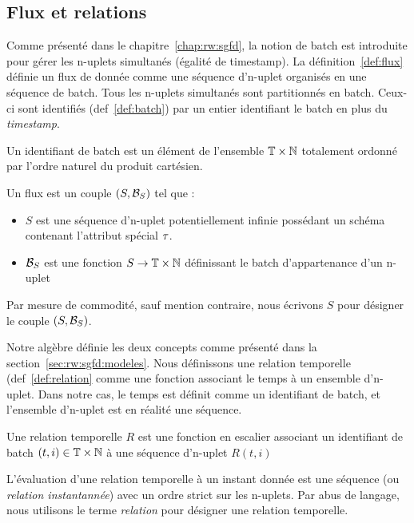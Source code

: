 \subsection{Flux et relations}
Comme présenté dans le chapitre~\ref{chap:rw:sgfd}, la notion de batch est introduite pour gérer les n-uplets simultanés (égalité de timestamp). La définition~\ref{def:flux}  définie un flux de donnée comme une séquence d'n-uplet organisés en une séquence de batch. Tous les n-uplets simultanés sont partitionnés en batch. Ceux-ci sont identifiés (def~\ref{def:batch}) par un entier identifiant le batch en plus du \textit{timestamp}.
\begin{defi}\label{def:batch}
    Un identifiant de batch est un élément de l'ensemble $\mathbb{T}\times\mathbb{N}$ totalement ordonné par l'ordre naturel du produit cartésien.
\end{defi}
\begin{defi}[Flux]\label{def:flux}
    Un flux est un couple $(S,\mathcal{B}_S)$ tel que :
    \begin{itemize}
        \item $S$ est une séquence d'n-uplet potentiellement infinie possédant un schéma contenant l'attribut spécial $\tau$.
        \item $\mathcal{B}_S$ est une fonction $S\to \mathbb{T}\times\mathbb{N}$ définissant le batch d'appartenance d'un n-uplet
    \end{itemize}
    
    Par mesure de commodité, sauf mention contraire, nous écrivons $S$ pour désigner le couple $(S,\mathcal{B}_S)$.
\end{defi}

Notre algèbre définie les deux concepts comme présenté dans la section~\ref{sec:rw:sgfd:modeles}. Nous définissons une relation temporelle (def~\ref{def:relation} comme une fonction associant le temps à un ensemble d'n-uplet. Dans notre cas, le temps est définit comme un identifiant de batch, et l'ensemble d'n-uplet est en réalité une séquence. 
\begin{defi}\label{def:relation}
	Une relation temporelle $R$ est une fonction en escalier associant un identifiant de batch $(t,i)\in\mathbb{T}\times\mathbb{N}$ à une séquence d'n-uplet $R(t,i)$
\end{defi}
L'évaluation d'une relation temporelle à un instant donnée est une séquence (ou \textit{relation instantannée}) avec un ordre strict sur les n-uplets. Par abus de langage, nous utilisons le terme \textit{relation} pour désigner une relation temporelle.

